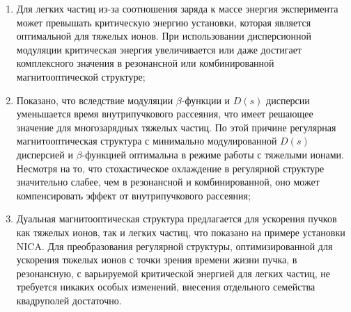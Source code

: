 \begin{enumerate}

\item  Для легких частиц из-за соотношения заряда к массе энергия эксперимента может превышать критическую энергию установки, которая является оптимальной для тяжелых ионов. При использовании дисперсионной модуляции критическая энергия увеличивается или даже достигает комплексного значения в резонансной или комбинированной магнитооптической структуре;

\item Показано, что вследствие модуляции $\beta$-функции и $D(s)$ дисперсии уменьшается время внутрипучкового рассеяния, что имеет решающее значение для многозарядных тяжелых частиц. По этой причине регулярная магнитооптическая структура с минимально модулированной $D(s)$ дисперсией и $\beta$-функцией оптимальна в режиме работы с тяжелыми ионами. Несмотря на то, что стохастическое охлаждение в регулярной структуре значительно слабее, чем в резонансной и комбинированной, оно может компенсировать эффект от внутрипучкового рассеяния;

\item Дуальная магнитооптическая структура предлагается для ускорения пучков как тяжелых ионов, так и легких частиц, что показано на примере установки NICA. Для преобразования регулярной структуры, оптимизированной для ускорения тяжелых ионов с точки зрения времени жизни пучка, в резонансную, с варьируемой критической энергией для легких частиц, не требуется никаких особых изменений, внесения отдельного семейства квадруполей достаточно.

\end{enumerate}

\FloatBarrier
